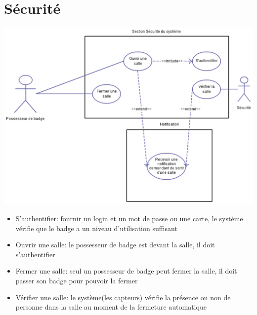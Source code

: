 \section{Sécurité}
\includegraphics[scale=0.8,angle=90]{cu/Securite.pdf}
\newpage
\begin{itemize}
\item S’authentifier: fournir un login et un mot de passe ou une carte, le système vérifie que le badge a un niveau d’utilisation suffisant
\item Ouvrir une salle: le possesseur de badge est devant la salle, il doit s’authentifier
\item Fermer une salle: seul un possesseur de badge peut fermer la salle, il doit passer son badge pour pouvoir la fermer
\item Vérifier une salle: le système(les capteurs) vérifie la présence ou non de personne dans la salle au moment de la fermeture automatique
\end{itemize}
